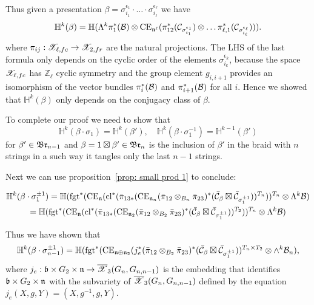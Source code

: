 \documentclass[10pt]{amsart}
\def\ZZ{\mathbb{Z} }
\begin{document}
Thus given a presentation $\beta=\sigma_{i_1}^{\epsilon_1}\cdot\dots\cdot\sigma_{i_\ell}^{\epsilon_\ell}$ we have
$$\mathbb{H}^k(\beta)=\mathbb{H}(\Lambda^k\pi_1^*(\mathcal{B})\otimes \mathrm{CE}_{\mathfrak{n}^\ell}(\pi_{12}^*(\mathcal{C}_{\sigma_{i_1}^{\epsilon_1}})\otimes
  \dots \pi_{\ell,1}^*(\mathcal{C}_{\sigma_{i_\ell}^{\epsilon_\ell}}))).$$
  where $\pi_{ij}:\mathscr{X}_{\ell,fc}\to \mathscr{X}_{2,fr}$ are the natural projections. The  LHS of the last formula  only depends on
  the cyclic order of the elements $\sigma_{i_k}^{\epsilon_k}$, because the space \(\mathscr{X}_{\ell,fc}\) has \(\ZZ_\ell\) cyclic symmetry and
  the group element \(g_{i,i+1}\) provides an isomorphism of the  vector bundles \(\pi_i^*(\mathcal{B})\) and \(\pi_{i+1}^*(\mathcal{B})\) for all \(i\).
  Hence we showed that $\mathbb{H}^k(\beta)$ only depends on the conjugacy
  class of $\beta$.








To complete our proof we need to show that
\begin{equation}\label{eq: Markov}
\mathbb{H}^k(\beta\cdot \sigma_1)=\mathbb{H}^k(\beta'),\quad \mathbb{H}^k(\beta\cdot \sigma_1^{-1})=\mathbb{H}^{k-1}(\beta')
\end{equation}
for $\beta'\in \mathfrak{Br}_{n-1}$ and $\beta=1\boxtimes\beta'\in \mathfrak{Br}_n$ is the inclusion of $\beta'$ in the braid with $n$ strings in a such way it tangles only the last $n-1$ strings.


Next we can use proposition~\ref{prop: small prod 1} to conclude:

\begin{multline*}\mathbb{H}^k(\beta\cdot \sigma_1^{\pm 1})=
\mathbb{H}(\mathrm{fgt}^*(\mathrm{CE}_{\mathfrak{n}}(\mathrm{cl}^*(\bar{\pi}_{13*}(\mathrm{CE}_{\mathfrak{n}_n}(\bar{\pi}_{12}\otimes_{B_n}\bar{\pi}_{23})^*(\bar{\mathcal{C}}_\beta\boxtimes\bar{\mathcal{C}}_{\sigma_1^{\pm 1}}))^{T_n}))^{T_n}\otimes \Lambda^k\mathcal{B})\\
=\mathbb{H}(\mathrm{fgt}^*(\mathrm{CE}_{\mathfrak{n}}(\mathrm{cl}^*(\bar{\pi}_{13*}(\mathrm{CE}_{\mathfrak{n}_2}(\bar{\pi}_{12}\otimes_{B_2}\bar{\pi}_{23})^*(\bar{\mathcal{C}}_\beta\boxtimes\bar{\mathcal{C}}_{\sigma^{\pm 1}_1}))^{T_2}))^{T_n}\otimes\Lambda^k\mathcal{B})
\end{multline*}







Thus we have shown that
$$ \mathbb{H}^k(\beta\cdot \sigma_{n-1}^{\pm 1})= \mathbb{H}(\mathrm{fgt}^*(\mathrm{CE}_{\mathfrak{n}\oplus \mathfrak{n}_2}(j^*_{e}(\bar{\pi}_{12}\otimes_{B_2}\bar{\pi}_{23})^*(\bar{\mathcal{C}}_{\beta}\boxtimes\bar{\mathcal{C}}_{\sigma_{1}^{\pm 1}}))^{T_n\times T_2}\otimes \wedge^k\mathcal{B}_n),$$
where $j_e:\mathfrak{b}\times G_2\times \mathfrak{n}\to \overline{\mathscr{X}}_3(G_n,G_{n,n-1})$ is the embedding that identifies $\mathfrak{b}\times G_2\times \mathfrak{n}$ with the subvariety of $\overline{\mathscr{X}}_3(G_n,G_{n,n-1})$ defined by the
equation $j_{e}(X,g,Y)=(X,g^{-1},g,Y)$.
\end{document}
